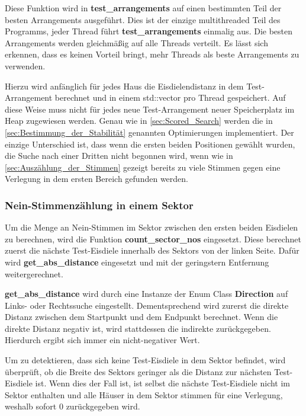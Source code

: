 \documentclass[a4paper,10pt,ngerman,captions=figureheading]{scrartcl}
\begin{document}
Diese Funktion wird in \textbf{test\_arrangements} auf einen bestimmten Teil der besten Arrangements ausgeführt.
Dies ist der einzige multithreaded Teil des Programms, jeder Thread führt \textbf{test\_arrangements} einmalig aus.
Die besten Arrangements werden gleichmäßig auf alle Threads verteilt.
Es lässt sich erkennen, dass es keinen Vorteil bringt, mehr Threads als beste Arrangements zu verwenden.

\medskip
Hierzu wird anfänglich für jedes Haus die Eisdielendistanz in dem Test-Arrangement berechnet und in einem std::vector pro Thread gespeichert.
Auf diese Weise muss nicht für jedes neue Test-Arrangement neuer Speicherplatz im Heap zugewiesen werden.
Genau wie in \autoref{sec:Scored_Search} werden die in \autoref{sec:Bestimmung_der_Stabilität} genannten Optimierungen implementiert.
Der einzige Unterschied ist, dass wenn die ersten beiden Positionen gewählt wurden, die Suche nach einer Dritten nicht begonnen wird, wenn wie in \autoref{sec:Auszählung_der_Stimmen} gezeigt bereits zu viele Stimmen gegen eine Verlegung in dem ersten Bereich gefunden werden.

\subsubsection{Nein-Stimmenzählung in einem Sektor}
\label{sec:Stimmenzählung_in_einem_Sektor}
Um die Menge an Nein-Stimmen im Sektor zwischen den ersten beiden Eisdielen zu berechnen, wird die Funktion \textbf{count\_sector\_nos} eingesetzt.
Diese berechnet zuerst die nächste Test-Eisdiele innerhalb des Sektors von der linken Seite.
Dafür wird \textbf{get\_abs\_distance} eingesetzt und mit der geringstern Entfernung weitergerechnet.

\medskip
\begin{addmargin}[3em]{4em}
    \textbf{get\_abs\_distance} wird durch eine Instanze der Enum Class \textbf{Direction} auf Links- oder Rechtssuche eingestellt.
    Dementsprechend wird zurerst die direkte Distanz zwischen dem Startpunkt und dem Endpunkt berechnet.
    Wenn die direkte Distanz negativ ist, wird stattdessen die indirekte zurückgegeben.
    Hierdurch ergibt sich immer ein nicht-negativer Wert.
\end{addmargin}

\medskip
Um zu detektieren, dass sich keine Test-Eisdiele in dem Sektor befindet, wird überprüft, ob die Breite des Sektors geringer als die Distanz zur nächsten Test-Eisdiele ist.
Wenn dies der Fall ist, ist selbst die nächste Test-Eisdiele nicht im Sektor enthalten und alle Häuser in dem Sektor stimmen für eine Verlegung, weshalb sofort $0$ zurückgegeben wird.
\end{document}
